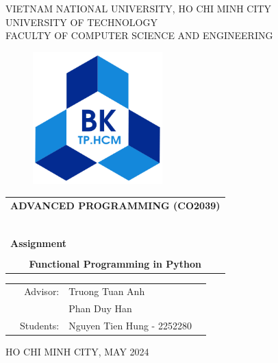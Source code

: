 \documentclass[12pt]{article}
\begin{document}
\begin{titlepage}
\begin{center}
VIETNAM NATIONAL UNIVERSITY, HO CHI MINH CITY \\
UNIVERSITY OF TECHNOLOGY \\
FACULTY OF COMPUTER SCIENCE AND ENGINEERING
\end{center}

\vspace{1cm}

\begin{figure}[h!]
\begin{center}
\includegraphics[width=5cm]{hcmut.png}
\end{center}
\end{figure}

\vspace{1cm}


\begin{center}
\begin{tabular}{c}
\multicolumn{1}{l}{\textbf{{\Large ADVANCED PROGRAMMING (CO2039)}}}\\
~~\\
\hline
\\
\multicolumn{1}{l}{\textbf{{\Large Assignment}}}\\
\\
\textbf{{\huge Functional Programming in Python}}
\\[0.8em]
\hline
\end{tabular}
\end{center}

\vspace{1cm}

\begin{table}[h]
\begin{tabular}{rrll}
\hspace{5 cm} & Advisor: & Truong Tuan Anh & \\
& & Phan Duy Han \\
& Students: & Nguyen Tien Hung - 2252280\\
\end{tabular}
\end{table}

\begin{center}
{\footnotesize HO CHI MINH CITY, MAY 2024}
\end{center}
\end{titlepage}
\end{document}
